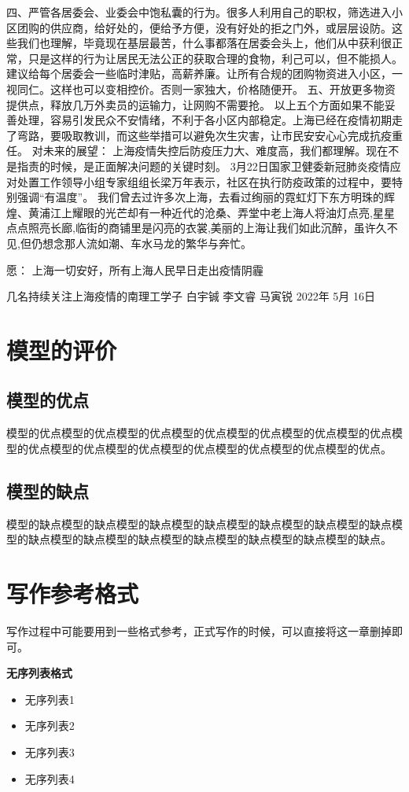 \documentclass[bwprint]{gmcmthesis}
\numberwithin{figure}{section}
\begin{document}
四、严管各居委会、业委会中饱私囊的行为。很多人利用自己的职权，筛选进入小区团购的供应商，给好处的，便给予方便，没有好处的拒之门外，或层层设防。这些我们也理解，毕竟现在基层最苦，什么事都落在居委会头上，他们从中获利很正常，只是这样的行为让居民无法公正的获取合理的食物，利己可以，但不能损人。建议给每个居委会一些临时津贴，高薪养廉。让所有合规的团购物资进入小区，一视同仁。这样也可以变相控价。否则一家独大，价格随便开。
五、开放更多物资提供点，释放几万外卖员的运输力，让网购不需要抢。
以上五个方面如果不能妥善处理，容易引发民众不安情绪，不利于各小区内部稳定。上海已经在疫情初期走了弯路，要吸取教训，而这些举措可以避免次生灾害，让市民安安心心完成抗疫重任。
对未来的展望：
上海疫情失控后防疫压力大、难度高，我们都理解。现在不是指责的时候，是正面解决问题的关键时刻。
3月22日国家卫健委新冠肺炎疫情应对处置工作领导小组专家组组长梁万年表示，社区在执行防疫政策的过程中，要特别强调“有温度”。
    我们曾去过许多次上海，去看过绚丽的霓虹灯下东方明珠的辉煌、黄浦江上耀眼的光芒却有一种近代的沧桑、弄堂中老上海人将油灯点亮,星星点点照亮长廊,临街的商铺里是闪亮的衣裳,美丽的上海让我们如此沉醉，虽许久不见,但仍想念那人流如潮、车水马龙的繁华与奔忙。

愿：
上海一切安好，所有上海人民早日走出疫情阴霾


几名持续关注上海疫情的南理工学子
白宇铖 李文睿 马寅锐
2022年 5月 16日


\section{模型的评价}
\subsection{模型的优点}
模型的优点模型的优点模型的优点模型的优点模型的优点模型的优点模型的优点模型的优点模型的优点模型的优点模型的优点模型的优点模型的优点模型的优点。
\subsection{模型的缺点}
模型的缺点模型的缺点模型的缺点模型的缺点模型的缺点模型的缺点模型的缺点模型的缺点模型的缺点模型的缺点模型的缺点模型的缺点模型的缺点模型的缺点。



\section{写作参考格式}
写作过程中可能要用到一些格式参考，正式写作的时候，可以直接将这一章删掉即可。

\textbf{无序列表格式}
\begin{itemize}
\item 无序列表1
\item 无序列表2
\item 无序列表3
\item 无序列表4
\end{itemize}
\end{document}
